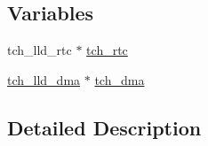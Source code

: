 \subsection*{Variables}
\begin{DoxyCompactItemize}
\item 
tch\+\_\+lld\+\_\+rtc $\ast$ \hyperlink{group___base___h_a_l___interface_ga1bc8ee9a981f8c5a20c70f715341c5b4}{tch\+\_\+rtc}
\item 
\hyperlink{structtch__lld__dma}{tch\+\_\+lld\+\_\+dma} $\ast$ \hyperlink{group___base___h_a_l___interface_ga1b84cc3423ad18d5cb1fa7b47228c8c6}{tch\+\_\+dma}
\end{DoxyCompactItemize}


\subsection{Detailed Description}


